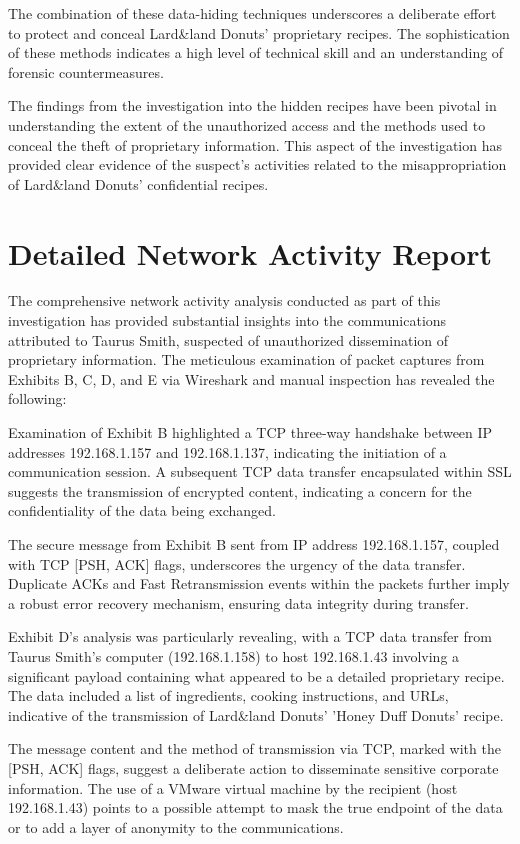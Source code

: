 The combination of these data-hiding techniques underscores a deliberate effort to protect and conceal Lard\&land Donuts' proprietary recipes. The sophistication of these methods indicates a high level of technical skill and an understanding of forensic countermeasures.

The findings from the investigation into the hidden recipes have been pivotal in understanding the extent of the unauthorized access and the methods used to conceal the theft of proprietary information. This aspect of the investigation has provided clear evidence of the suspect's activities related to the misappropriation of Lard\&land Donuts' confidential recipes.

\section{Detailed Network Activity Report}
The comprehensive network activity analysis conducted as part of this investigation has provided substantial insights into the communications attributed to Taurus Smith, suspected of unauthorized dissemination of proprietary information. The meticulous examination of packet captures from Exhibits B, C, D, and E via Wireshark and manual inspection has revealed the following:

Examination of Exhibit B highlighted a TCP three-way handshake between IP addresses 192.168.1.157 and 192.168.1.137, indicating the initiation of a communication session. A subsequent TCP data transfer encapsulated within SSL suggests the transmission of encrypted content, indicating a concern for the confidentiality of the data being exchanged.

The secure message from Exhibit B sent from IP address 192.168.1.157, coupled with TCP [PSH, ACK] flags, underscores the urgency of the data transfer. Duplicate ACKs and Fast Retransmission events within the packets further imply a robust error recovery mechanism, ensuring data integrity during transfer.

Exhibit D's analysis was particularly revealing, with a TCP data transfer from Taurus Smith's computer (192.168.1.158) to host 192.168.1.43 involving a significant payload containing what appeared to be a detailed proprietary recipe. The data included a list of ingredients, cooking instructions, and URLs, indicative of the transmission of Lard\&land Donuts' 'Honey Duff Donuts' recipe.

The message content and the method of transmission via TCP, marked with the [PSH, ACK] flags, suggest a deliberate action to disseminate sensitive corporate information. The use of a VMware virtual machine by the recipient (host 192.168.1.43) points to a possible attempt to mask the true endpoint of the data or to add a layer of anonymity to the communications.

